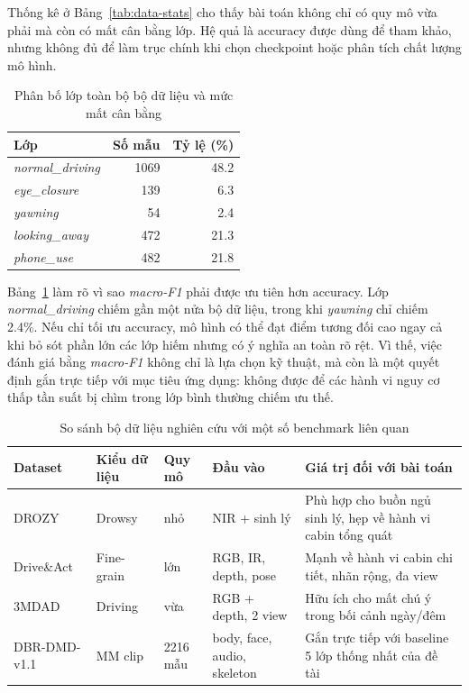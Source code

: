 \documentclass[conference,a4paper]{IEEEtran}
\begin{document}
Thống kê ở Bảng~\ref{tab:data-stats} cho thấy bài toán không chỉ có quy mô vừa phải mà còn có mất cân bằng lớp. Hệ quả là accuracy được dùng để tham khảo, nhưng không đủ để làm trục chính khi chọn checkpoint hoặc phân tích chất lượng mô hình.

\begin{table}[t]
\caption{Phân bố lớp toàn bộ bộ dữ liệu và mức mất cân bằng}
\label{tab:class-imbalance}
\centering
\small
\begin{tabular}{lrr}
\toprule
Lớp & Số mẫu & Tỷ lệ (\%) \\
\midrule
\textit{normal\_driving} & 1069 & 48.2 \\
\textit{eye\_closure} & 139 & 6.3 \\
\textit{yawning} & 54 & 2.4 \\
\textit{looking\_away} & 472 & 21.3 \\
\textit{phone\_use} & 482 & 21.8 \\
\bottomrule
\end{tabular}
\end{table}

Bảng~\ref{tab:class-imbalance} làm rõ vì sao \textit{macro-F1} phải được ưu tiên hơn accuracy. Lớp \textit{normal\_driving} chiếm gần một nửa bộ dữ liệu, trong khi \textit{yawning} chỉ chiếm 2.4\%. Nếu chỉ tối ưu accuracy, mô hình có thể đạt điểm tương đối cao ngay cả khi bỏ sót phần lớn các lớp hiếm nhưng có ý nghĩa an toàn rõ rệt. Vì thế, việc đánh giá bằng \textit{macro-F1} không chỉ là lựa chọn kỹ thuật, mà còn là một quyết định gắn trực tiếp với mục tiêu ứng dụng: không được để các hành vi nguy cơ thấp tần suất bị chìm trong lớp bình thường chiếm ưu thế.

\begin{table}[t]
\caption{So sánh bộ dữ liệu nghiên cứu với một số benchmark liên quan}
\label{tab:dataset-comparison}
\centering
\scriptsize
\begin{tabular}{L{1.2cm}L{0.8cm}L{0.8cm}L{1.1cm}L{2.15cm}}
\toprule
Dataset & Kiểu dữ liệu & Quy mô & Đầu vào & Giá trị đối với bài toán \\
\midrule
DROZY & Drowsy & nhỏ & NIR + sinh lý & Phù hợp cho buồn ngủ sinh lý, hẹp về hành vi cabin tổng quát \\
Drive\&Act & Fine-grain & lớn & RGB, IR, depth, pose & Mạnh về hành vi cabin chi tiết, nhãn rộng, đa view \\
3MDAD & Driving & vừa & RGB + depth, 2 view & Hữu ích cho mất chú ý trong bối cảnh ngày/đêm \\
DBR-DMD-v1.1 & MM clip & 2216 mẫu & body, face, audio, skeleton & Gắn trực tiếp với baseline 5 lớp thống nhất của đề tài \\
\bottomrule
\end{tabular}
\end{table}
\end{document}
